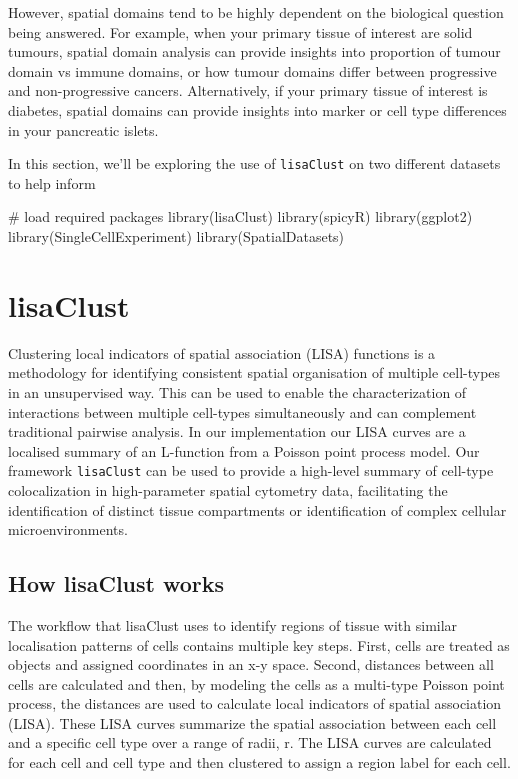 \documentclass[
  letterpaper,
  DIV=11,
  numbers=noendperiod]{scrreprt}
\newenvironment{Shaded}{\begin{snugshade}}{\end{snugshade}}
\newcommand{\CommentTok}[1]{\textcolor[rgb]{0.37,0.37,0.37}{#1}}
\newcommand{\FunctionTok}[1]{\textcolor[rgb]{0.28,0.35,0.67}{#1}}
\newcommand{\NormalTok}[1]{\textcolor[rgb]{0.00,0.23,0.31}{#1}}
\begin{document}
However, spatial domains tend to be highly dependent on the biological
question being answered. For example, when your primary tissue of
interest are solid tumours, spatial domain analysis can provide insights
into proportion of tumour domain vs immune domains, or how tumour
domains differ between progressive and non-progressive cancers.
Alternatively, if your primary tissue of interest is diabetes, spatial
domains can provide insights into marker or cell type differences in
your pancreatic islets.

In this section, we'll be exploring the use of \texttt{lisaClust} on two
different datasets to help inform

\begin{Shaded}
\begin{Highlighting}[]
\CommentTok{\# load required packages}
\FunctionTok{library}\NormalTok{(lisaClust)}
\FunctionTok{library}\NormalTok{(spicyR)}
\FunctionTok{library}\NormalTok{(ggplot2)}
\FunctionTok{library}\NormalTok{(SingleCellExperiment)}
\FunctionTok{library}\NormalTok{(SpatialDatasets)}
\end{Highlighting}
\end{Shaded}

\section{lisaClust}\label{lisaclust-1}

Clustering local indicators of spatial association (LISA) functions is a
methodology for identifying consistent spatial organisation of multiple
cell-types in an unsupervised way. This can be used to enable the
characterization of interactions between multiple cell-types
simultaneously and can complement traditional pairwise analysis. In our
implementation our LISA curves are a localised summary of an L-function
from a Poisson point process model. Our framework \texttt{lisaClust} can
be used to provide a high-level summary of cell-type colocalization in
high-parameter spatial cytometry data, facilitating the identification
of distinct tissue compartments or identification of complex cellular
microenvironments.

\subsection{How lisaClust works}\label{how-lisaclust-works}

The workflow that lisaClust uses to identify regions of tissue with
similar localisation patterns of cells contains multiple key steps.
First, cells are treated as objects and assigned coordinates in an x-y
space. Second, distances between all cells are calculated and then, by
modeling the cells as a multi-type Poisson point process, the distances
are used to calculate local indicators of spatial association (LISA).
These LISA curves summarize the spatial association between each cell
and a specific cell type over a range of radii, r. The LISA curves are
calculated for each cell and cell type and then clustered to assign a
region label for each cell.
\end{document}
